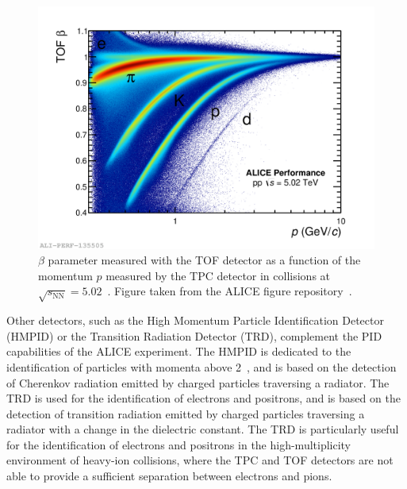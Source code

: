 \begin{figure}
    \centering
    \includegraphics[width=0.7\linewidth]{Figures/Chapter 4/TOFBeta_pp.png}
    \caption{$\beta$ parameter measured with the TOF detector as a function of the momentum $p$ measured by the TPC detector in \pbpb collisions at $\sqrt{s_\mathrm{NN}} = 5.02$~\tev. Figure taken from the ALICE figure repository~\cite{ALICE_figures}.}
    \label{fig:TOFPID}
\end{figure}

Other detectors, such as the High Momentum Particle Identification Detector (HMPID) or the Transition Radiation Detector (TRD), complement the PID capabilities of the ALICE experiment. The HMPID is dedicated to the identification of particles with momenta above 2~\gevc, and is based on the detection of Cherenkov radiation emitted by charged particles traversing a radiator. The TRD is used for the identification of electrons and positrons, and is based on the detection of transition radiation emitted by charged particles traversing a radiator with a change in the dielectric constant. The TRD is particularly useful for the identification of electrons and positrons in the high-multiplicity environment of heavy-ion collisions, where the TPC and TOF detectors are not able to provide a sufficient separation between electrons and pions. 

